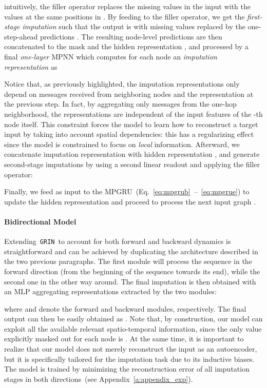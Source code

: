 \documentclass{article} \usepackage{iclr2022_conference,times}
\newcommand{\GRIL}{\texttt{GRIN}}
\begin{document}
intuitively, the filler operator replaces the missing values in the input  with the values at the same positions in .
By feeding  to the filler operator, we get the \textit{first-stage imputation}  such that the output is  with missing values replaced by the one-step-ahead predictions . The resulting node-level predictions are then concatenated to the mask  and the hidden representation , and processed by a final \emph{one-layer} MPNN which computes for each node an \emph{imputation representation}  as

Notice that, as previously highlighted, the imputation representations only depend on messages received from neighboring nodes and the representation at the previous step. In fact, by aggregating only messages from the one-hop neighborhood,
the representations  are independent of the input features  of the -th node itself. This constraint forces the model to learn how to reconstruct a target input by taking into account spatial dependencies: this has a regularizing effect since the model is constrained to focus on \emph{local} information. Afterward, we concatenate imputation representation  with hidden representation , and generate second-stage imputations by using a second linear readout and applying the filler operator:

Finally, we feed  as input to the MPGRU~(Eq.~\ref{eq:mpgrub}~--~\ref{eq:mpgrue}) to update the hidden representation and proceed to process the next input graph .

\paragraph{Bidirectional Model} Extending~\GRIL\ to account for both forward and backward dynamics is straightforward and can be achieved by duplicating the architecture described in the two previous paragraphs. The first module will process the sequence in the forward direction (from the beginning of the sequence towards its end), while the second one in the other way around. The final imputation is then obtained with an MLP aggregating representations extracted by the two modules:

where  and  denote the forward and backward modules, respectively. The final output can then be easily obtained as . Note that, by construction, our model can exploit all the available relevant spatio-temporal information, since the only value explicitly masked out for each node is . At the same time, it is important to realize that our model does not merely reconstruct the input as an autoencoder, but it is specifically tailored for the imputation task due to its inductive biases. The model is trained by minimizing the reconstruction error of all imputation stages in both directions~(see Appendix~\ref{a:appendix_exp}).
\end{document}
